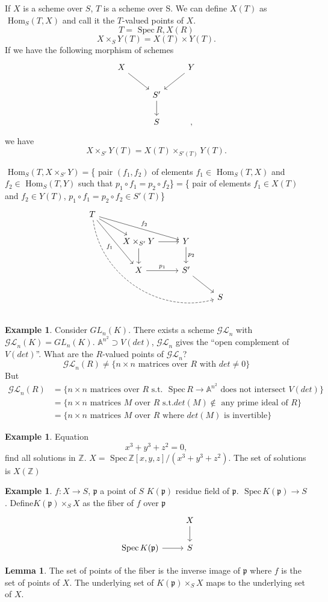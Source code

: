 \documentclass[11pt]{article}
\theoremstyle{definition}
\newtheorem{lemma}[thm]{Lemma}
\newtheorem{ex}[thm]{Example}
\renewcommand{\hom}{\text{ Hom}}
\newcommand{\spec}{\text{ Spec}\,}
\newcommand{\affn}{\mathbb A}
\newcommand{\intg}{\mathbb Z}
\newcommand{\scp}{{\mathfrak p}}
\newcommand{\lrta}{\longrightarrow}
\begin{document}
If $X$ is a scheme over $S$, $T$ is a scheme over S. We can define $X(T)$ as $\hom_S(T,X)$
and call it the $T$-valued points of $X$.
$$
T=\spec R, X(R)
$$
$$
X\times_S Y(T)=X(T)\times Y(T).
$$
If we have the following morphism of schemes
$$
\begin{tikzcd}
X \arrow[rd] &  & Y \arrow[ld] \\
 & S' \arrow[d] &  \\
 & S &, 
\end{tikzcd}
$$
 we have 
 $$
X\times_{S'} Y(T)=X(T)\times_{S'(T)} Y(T).
 $$

$\hom_S(T,X\times_{S'}Y)=$\{ pair $(f_1,f_2)$ of elements $f_1\in \hom_{S}(T,X)$ and $f_2\in \hom_S(T,Y)$  such that $p_1\circ f_1=p_2\circ f_2$\}$=$\{ pair of elements $f_1\in X(T)$ and $f_2\in Y(T)$, $p_1\circ f_1=p_2\circ f_2\in S'(T)$\}
$$
\begin{tikzcd}
T \arrow[rd] \arrow[rdd, "f_1"'] \arrow[rrd, "f_2"] \arrow[rrrddd, dashed, bend right=49] &  &  &  \\
 & X\times_{S'}Y \arrow[d] \arrow[r] & Y \arrow[d, "p_2"] &  \\
 & X \arrow[r, "p_1"] & S' \arrow[rd] &  \\
 &  &  & S
\end{tikzcd}
$$
\begin{ex}Consider
$GL_n(K)$. There exists a scheme $\mathcal{GL}_n$ with $\mathcal{GL}_n(K)=GL_n(K)$.
$\affn^{n^2}\supset V(det)$, $\mathcal{GL}_n$ gives the ``open complement of $V(det)$''. What are the $R$-valued points of $\mathcal{GL}_n$?
$$
\mathcal{GL}_n(R)\neq \{n\times n\text{ matrices over $R$ with } det \neq 0 \}
$$
But
$$
\begin{aligned}
\mathcal{GL}_n(R)&=\{n\times n\text{ matrices over $R$ s.t. }\spec R\lrta \affn^{n^2}\text{ does not intersect }V(det)\}\\
&=\{n\times n\text{ matrices $M$ over $R$ s.t.} det(M) \notin\text{ any prime ideal of }R \}\\
&=\{n\times n\text{ matrices $M$ over $R$ where } det(M)\text{ is invertible}\}
\end{aligned}
$$
\end{ex}

\begin{ex}
Equation
$$
x^3+y^3+z^2=0,
$$
find all solutions in $\intg$. 
$X=\spec \intg[x,y,z]/(x^3+y^3+z^2)$. The set of solutions is $X(\intg)$
\end{ex}

\begin{ex}
$f:X\lrta S$, $\scp$ a point of $S$
$K(\scp)$ residue field of $\scp$. $\spec K(\scp)\lrta S$. Define$K(\scp)\times_S X$ as the fiber of $f$ over $\scp$
$$
\begin{tikzcd}
 & X \arrow[d] \\
\spec K(\scp) \arrow[r] & S
\end{tikzcd}
$$
\end{ex}
\begin{lemma}
The set of points of the fiber is the inverse image of $\scp$ where $f$ is the set of points of $X$. The underlying set of $K(\scp)\times_SX$ maps to the underlying set of $X$.


\end{lemma}
\end{document}
